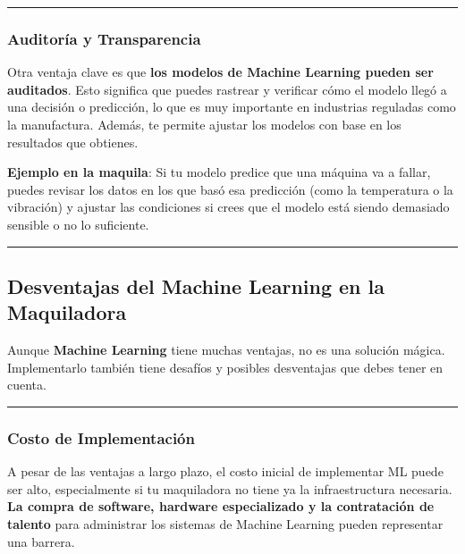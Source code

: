 \documentclass[
  10pt,
  letterpaper,
]{book}
\begin{document}
\begin{center}\rule{0.5\linewidth}{0.5pt}\end{center}

\subsubsection{\texorpdfstring{\textbf{Auditoría y
Transparencia}}{Auditoría y Transparencia}}\label{auditoruxeda-y-transparencia}

Otra ventaja clave es que \textbf{los modelos de Machine Learning pueden
ser auditados}. Esto significa que puedes rastrear y verificar cómo el
modelo llegó a una decisión o predicción, lo que es muy importante en
industrias reguladas como la manufactura. Además, te permite ajustar los
modelos con base en los resultados que obtienes.

\textbf{Ejemplo en la maquila}: Si tu modelo predice que una máquina va
a fallar, puedes revisar los datos en los que basó esa predicción (como
la temperatura o la vibración) y ajustar las condiciones si crees que el
modelo está siendo demasiado sensible o no lo suficiente.

\begin{center}\rule{0.5\linewidth}{0.5pt}\end{center}

\subsection{Desventajas del Machine Learning en la
Maquiladora}\label{desventajas-del-machine-learning-en-la-maquiladora}

Aunque \textbf{Machine Learning} tiene muchas ventajas, no es una
solución mágica. Implementarlo también tiene desafíos y posibles
desventajas que debes tener en cuenta.

\begin{center}\rule{0.5\linewidth}{0.5pt}\end{center}

\subsubsection{\texorpdfstring{\textbf{Costo de
Implementación}}{Costo de Implementación}}\label{costo-de-implementaciuxf3n}

A pesar de las ventajas a largo plazo, el costo inicial de implementar
ML puede ser alto, especialmente si tu maquiladora no tiene ya la
infraestructura necesaria. \textbf{La compra de software, hardware
especializado y la contratación de talento} para administrar los
sistemas de Machine Learning pueden representar una barrera.
\end{document}
